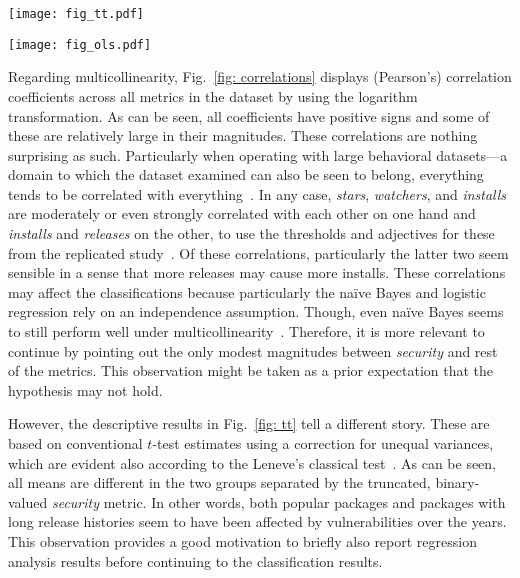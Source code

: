 \documentclass[5p, twocolumn, numbers, sort]{elsarticle}
\begin{document}
\begin{figure*}[th!b]
\centering
\texttt{[image: fig\_tt.pdf]}
\caption{Means Across Vulnerability Groups (Welch's \cite{Welch47} approximation
  for unequal variances; all $t$-tests statistically significant at )}
\label{fig: tt}
\end{figure*}

\begin{figure*}[th!b]
\centering
\texttt{[image: fig\_ols.pdf]}
\caption{Regression Results (OLS, full sample)}
\label{fig: ols}
\end{figure*}

Regarding multicollinearity, Fig.~\ref{fig: correlations} displays (Pearson's)
correlation coefficients across all metrics in the dataset by using the
logarithm transformation. As can be seen, all coefficients have positive signs
and some of these are relatively large in their magnitudes. These correlations
are nothing surprising as such. Particularly when operating with large
behavioral datasets---a domain to which the dataset examined can also be seen to
belong, everything tends to be correlated with everything~\cite{Meeh90}. In any
case, \textit{stars}, \textit{watchers}, and \textit{installs} are moderately or
even strongly correlated with each other on one hand and \textit{installs} and
\textit{releases} on the other, to use the thresholds and adjectives for these
from the replicated study~\cite{Siavvas18}. Of these correlations, particularly
the latter two seem sensible in a sense that more releases may cause more
installs. These correlations may affect the classifications because particularly
the na\"ive Bayes and logistic regression rely on an independence
assumption. Though, even na\"ive Bayes seems to still perform well under
multicollinearity~\cite{Araveeporn24}. Therefore, it is more relevant to
continue by pointing out the only modest magnitudes between \textit{security}
and rest of the metrics. This observation might be taken as a prior expectation
that the hypothesis may not hold.

However, the descriptive results in Fig.~\ref{fig: tt} tell a different
story. These are based on conventional $t$-test estimates using a correction for
unequal variances, which are evident also according to the Leneve's classical
test~\cite{Leneve60}. As can be seen, all means are different in the two groups
separated by the truncated, binary-valued \textit{security} metric. In other
words, both popular packages and packages with long release histories seem to
have been affected by vulnerabilities over the years. This observation provides
a good motivation to briefly also report regression analysis results before
continuing to the classification results.
\end{document}

